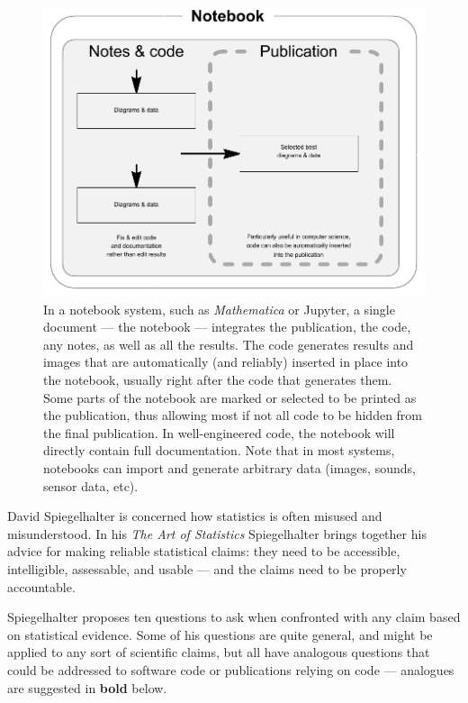 \documentclass[10pt,a4paper]{article}
\begin{document}
\begin{figure}[t]
   \centering
   \includegraphics[width=5in]{generated/notebook.pdf} 
   \caption{In a notebook system, such as \emph{Mathematica\/} or Jupyter, a single document --- the notebook --- integrates the publication, the code, any notes, as well as all the results. The code generates results and images that are automatically (and reliably) inserted in place into the notebook, usually right after the code that generates them. Some parts of the notebook are marked or selected to be printed as the publication, thus allowing most if not all code to be hidden from the final publication. In well-engineered code, the notebook will directly contain full documentation.
Note that in most systems, notebooks can import and generate arbitrary data (images, sounds, sensor data, etc).}
   \label{fig:notebook}
\end{figure}


David Spiegelhalter is concerned how statistics is often misused and misunderstood. In his \emph{The Art of Statistics\/} \cite{Spiegelhalter} Spiegelhalter brings together his advice for making reliable statistical claims: they need to be accessible, intelligible, assessable, and usable --- and the claims need to be properly accountable. 

Spiegelhalter proposes ten questions to ask when confronted with any claim based on statistical evidence. Some of his questions are quite general, and might be applied to any sort of scientific claims, but all have analogous questions that could be addressed to software code or publications relying on code --- analogues are suggested in \textbf{bold} below. 
\end{document}
